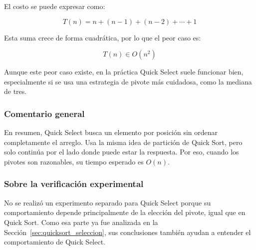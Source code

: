El costo se puede expresar como:

\[
T(n)=n+(n-1)+(n-2)+\cdots+1
\]

Esta suma crece de forma cuadrática, por lo que el peor caso es:

\[
T(n)\in O(n^2)
\]

Aunque este peor caso existe, en la práctica Quick Select suele funcionar bien, especialmente si se usa una estrategia de pivote más cuidadosa, como la mediana de tres.

\subsubsection{Comentario general}

En resumen, Quick Select busca un elemento por posición sin ordenar completamente el arreglo. Usa la misma idea de partición de Quick Sort, pero solo continúa por el lado donde puede estar la respuesta. Por eso, cuando los pivotes son razonables, su tiempo esperado es $O(n)$.

\subsubsection*{Sobre la verificación experimental}

No se realizó un experimento separado para Quick Select porque su comportamiento depende principalmente de la elección del pivote, igual que en Quick Sort. Como esa parte ya fue analizada en la Sección~\ref{sec:quicksort_seleccion}, sus conclusiones también ayudan a entender el comportamiento de Quick Select.